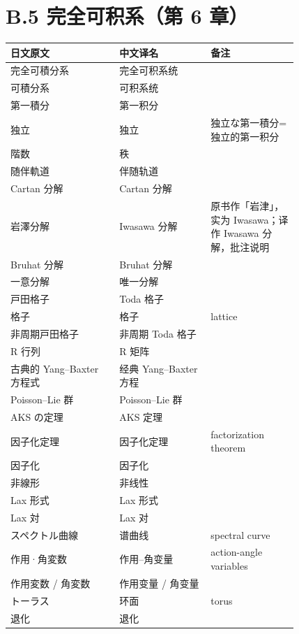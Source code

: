 \section*{B.5 完全可积系（第 6 章）}
{\small
\begin{longtable}{p{0.31\linewidth} p{0.26\linewidth} p{0.25\linewidth}}
\toprule
日文原文 & 中文译名 & 备注 \\
\midrule
\endhead
完全可積分系 & 完全可积系统 &  \\
可積分系 & 可积系统 &  \\
第一積分 & 第一积分 &  \\
独立 & 独立 & 独立な第一積分=独立的第一积分 \\
階数 & 秩 &  \\
随伴軌道 & 伴随轨道 &  \\
Cartan 分解 & Cartan 分解 &  \\
岩澤分解 & Iwasawa 分解 & 原书作「岩津」，实为 Iwasawa；译作 Iwasawa 分解，批注说明 \\
Bruhat 分解 & Bruhat 分解 &  \\
一意分解 & 唯一分解 &  \\
戸田格子 & Toda 格子 &  \\
格子 & 格子 & lattice \\
非周期戸田格子 & 非周期 Toda 格子 &  \\
R 行列 & R 矩阵 &  \\
古典的 Yang–Baxter 方程式 & 经典 Yang–Baxter 方程 &  \\
Poisson–Lie 群 & Poisson–Lie 群 &  \\
AKS の定理 & AKS 定理 &  \\
因子化定理 & 因子化定理 & factorization theorem \\
因子化 & 因子化 &  \\
非線形 & 非线性 &  \\
Lax 形式 & Lax 形式 &  \\
Lax 対 & Lax 对 &  \\
スペクトル曲線 & 谱曲线 & spectral curve \\
作用·角変数 & 作用–角变量 & action-angle variables \\
作用変数 / 角変数 & 作用变量 / 角变量 &  \\
トーラス & 环面 & torus \\
退化 & 退化 &  \\
\bottomrule
\end{longtable}
}

